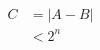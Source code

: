 \documentclass[preview]{standalone}
\begin{document}
\begin{align*}
\
                     C &= |A - B| \\ \
                        &< 2^n
\end{align*}
\end{document}
